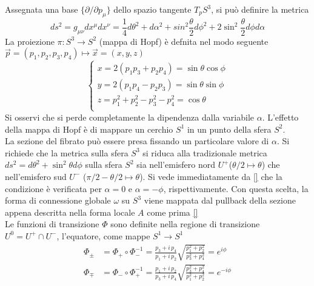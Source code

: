 Assegnata una base $ \{ \partial/\partial p_\mu \} $ dello spazio tangente
$T_p S^3$, si può definire la metrica
\begin{equation}
   d s^2 = g_{\mu\nu} dx^\mu dx^\nu
         = \frac{1}{4} d\theta^2 + d\alpha^2 + sin^2\frac{\theta}{2}d\phi^2
         + 2\sin^2\frac{\theta}{2} d\phi d\alpha
\end{equation}
La proiezione $\pi : S^3 \to S^2$ (mappa di Hopf) è defnita nel modo seguente
$\vec p = (p_1,p_2,p_3,p_4) \mapsto \vec x = (x,y,z)$
\begin{equation}
   \begin{cases}
      x = 2(p_1 p_3 + p_2 p_4)          = \sin\theta \cos\phi \\
      y = 2(p_1 p_4 - p_2 p_3)          = \sin\theta \sin\phi \\
      z = p_1^2 + p_2^2 - p_3^2 - p_4^2 = \cos\theta          \\
   \end{cases}
\end{equation}
Si osservi che si perde completamente la dipendenza dalla variabile $\alpha$.
L'effetto della mappa di Hopf è di mappare un cerchio $S^1$ in un punto
della sfera $S^2$.\\

La sezione del fibrato può essere presa fissando un particolare valore di $\alpha$.
Si richiede che la metrica sulla sfera $S^3$ si riduca alla tradizionale metrica
$ds^2 = d\theta^2 + \sin^2\theta d\phi$ sulla sfera $S^2$ sia nell'emisfero
nord $U^+$($ \theta/2 \mapsto \theta $) che nell'emisfero sud $U^-$
($\pi/2 - \theta/2 \mapsto \theta $). Si vede immediatamente da \ref{} che la
condizione è verificata per $\alpha = 0$ e $\alpha = -\phi$, rispettivamente.
Con questa scelta, la forma di connessione globale $\omega$ su $S^3$
viene mappata dal pullback della sezione appena descritta nella forma locale $A$
come prima \ref{}\\

Le funzioni di transizione $\Phi$ sono definite nella regione di transizione
$U^0 = U^+ \cap U^-$, l'equatore, come mappe $S^1 \to S^1$
\begin{equation}
   \begin{aligned}
  \Phi_\pm & = \Phi_+ \circ \Phi_- ^{-1}
             = \frac{p_3 +  i \, p_4}{p_1 + i \, p_2}
                \sqrt{ \frac{p_1^2 + p_2^2}{p_3^2 + p_4^2} }
             = e^{i\phi} \\
  \Phi_\mp & = \Phi_- \circ \Phi_+ ^{-1}
             = \frac{p_1 + i \, p_2}{p_3 +  i \, p_4}
                  \sqrt{ \frac{p_3^2 + p_4^2}{p_1^2 + p_2^2}}
             = e^{-i\phi}
   \end{aligned}
\end{equation}


